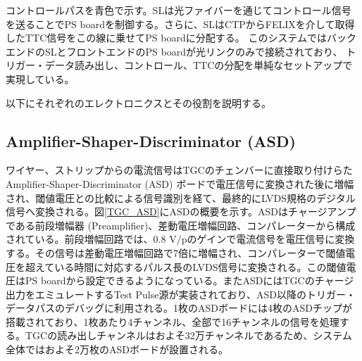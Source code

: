 コントロールパスを青色で示す。SLは光ファイバーを通じてコントロール信号を送ることでPS boardを制御する。さらに、SLはCTPからFELIXを介して取得したTTC信号をこの線に乗せてPS boardに分配する。
このシステムではバックエンドのSLとフロントエンドのPS boardが光リンクのみで接続されており、
トリガー・データ読み出し、コントロール、TTCの分配を単純なセットアップで実現している。

以下にそれぞれのエレクトロニクスとその役割を説明する。

        \subsection*{Amplifier-Shaper-Discriminator (ASD)}
    ワイヤー、ストリップからの電流信号はTGCのチェンバーに直接取り付けらたAmplifier-Shaper-Discriminator  (ASD) ボードで電圧信号に変換された後に増幅され、閾値電圧との比較による信号識別を経て、最終的にLVDS規格のデジタル信号へ変換される。図\ref{TGC_ASD}にASDの概要を示す。ASDはチャージアンプである前段増幅器 (Preamplifier)、差動電圧増幅回路、コンパレーターから構成されている。前段増幅回路では、0.8 V/pのゲインで電流信号を電圧信号に変換する。その信号は差動電圧増幅回路で7倍に増幅され、コンパレーターで閾値電圧を超えている時間に対応するパルス長のLVDS信号に変換される。この閾値電圧はPS boardから設定できるようになっている。またASDにはTGCのチャージ出力をエミュレートするTest Pulse源が実装されており、ASD以降のトリガー・データパスのデバッグに利用される。1枚のASDボードには4枚のASDチップが搭載されており、1枚あたり4チャンネル、全部で16チャンネルの信号を処理する。TGCの読み出しチャンネルはおよそ32万チャンネルであるため、システム全体ではおよそ2万枚のASDボードが設置される。

